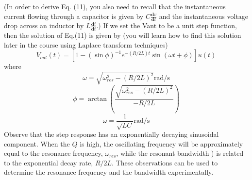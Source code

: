 \documentclass[12pt]{article}
\begin{document}
(In order to derive Eq. (11), you also need to recall that the instantaneous current flowing through a capacitor is given by $C\frac{\mathbf{d}v}{\mathbf{d}t}$ and the instantaneous voltage drop across an inductor by $L\frac{\mathbf{d}i}{\mathbf{d}t}$.) If we set the
Vant to be a unit step function, then the solution of Eq.(11) is given by (you will learn how to find this
solution later in the course using Laplace transform techniques)
\begin{equation}
V_{out}(t)=[1-(\sin\phi)^{-1}e^{-(R/2L)t}\sin(\omega t+\phi)]u(t)
\end{equation}
where 
\begin{equation}
\omega=\sqrt{\omega^2_{res}-(R/2L)^2}\text{rad/s}
\end{equation}
\begin{equation}
\phi=\arctan(\frac{\sqrt{\omega^2_{res}-(R/2L)^2}}{-R/2L})
\end{equation}
\begin{equation}
\omega=\frac{1}{\sqrt{LC}}\text{rad/s}
\end{equation}
Observe that the step response has an exponentially decaying sinusoidal component. When the $Q$ is high,
the oscillating frequency will be approximately equal to the resonance frequency, $\omega_{res}$, while the resonant
bandwidth ) is related to the exponential decay rate, $R/2L$. These observations can be used
to determine the resonance frequency and the bandwidth experimentally.
\end{document}
